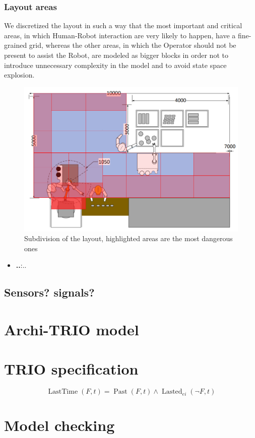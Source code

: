 \documentclass[a4paper]{article}
\DeclareMathOperator{\past}{Past}
\DeclareMathOperator{\lastedOp}{Lasted}
\newcommand{\lasted}{\lastedOp_{ei}}
\DeclareMathOperator{\lasttime}{LastTime}
\begin{document}
\subsubsection{Layout areas}
We discretized the layout in such a way that the most important and critical areas, in which Human-Robot interaction are very likely to happen, have a fine-grained grid, whereas the other areas, in which the Operator should not be present to assist the Robot, are modeled as bigger blocks in order not to introduce unnecessary complexity in the model and to avoid state space explosion.
\begin{figure}[htp] 
\includegraphics[width=\textwidth]{images/layout} 
\caption{Subdivision of the layout, highlighted areas are the most dangerous ones} 
\label{fig:layout} 
\end{figure}

\begin{itemize}
	\item \textbf{..}:\@ ..
\end{itemize}

\subsection{Sensors? signals?}
\clearpage
\section{Archi-TRIO model}




\clearpage
\section{TRIO specification}
\begin{equation*}
\lasttime(F, t) = \past(F, t) \land \lasted(\lnot F, t)
\end{equation*}

\section{Model checking}
\end{document}

